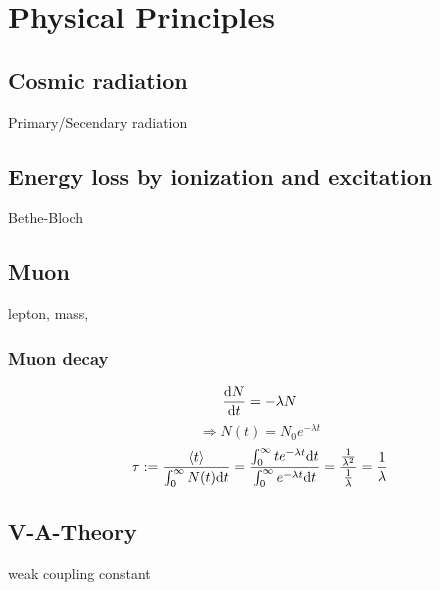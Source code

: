 \section{Physical Principles}
\subsection{Cosmic radiation}
Primary/Secendary radiation
\subsection{Energy loss by ionization and excitation}
Bethe-Bloch
\subsection{Muon}
lepton, mass,
\subsubsection{Muon decay}
\label{sub:decay}
\begin{equation}
	\frac{\mathrm{d} N}{\mathrm{d} t} = - \lambda N
\end{equation}
\begin{equation}
    \Rightarrow N(t) = N_0 e^{-\lambda t}
\end{equation}
\begin{equation}
    \tau := \frac{\left<t\right>}{\int_0^\infty N(t) \mathrm{d} t} = 
    \frac{\int_0^\infty t e^{-\lambda t} \mathrm{d} t}{\int_0^\infty e^{-\lambda t} \mathrm{d} t} = 
    \frac{\frac{1}{\lambda^2}}{\frac{1}{\lambda}} = \frac{1}{\lambda}
\end{equation}
\subsection{V-A-Theory}
weak coupling constant